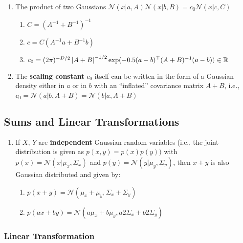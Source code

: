 \begin{enumerate}
    \item The product of two Gaussians 
    $\mathcal{N}(x|a, A) \mathcal{N}(x|b, B) = c_0\mathcal{N}(x|c, C)$
    \begin{enumerate}
        \item $C = (A^{-1} + B^{-1})^{-1}$

        \item $c = C(A^{-1}a + B^{-1}b)$

        \item $
            c_0 
            = (2\pi)^{-D/2}
            \left| A + B \right|^{-1/2}
            \exp(-0.5(a - b)^\top(A + B)^{-1}(a - b))
            \in \mathbb{R}
        $

    \end{enumerate}

    \item The \textbf{scaling constant} $c_0$ itself can be written in the form of a Gaussian density either in $a$ or in $b$ with an “inflated” covariance matrix $A + B$, i.e., $
        c_0 
        = \mathcal{N}(a|b, A + B) 
        = \mathcal{N}(b|a, A + B)
    $

\end{enumerate}


\subsection{Sums and Linear Transformations \cite{ism-1}} \label{Normal distribution: Bivariate/ Multivariate: Sums and Linear Transformations}

\begin{enumerate}
    \item If $X$, $Y$ are \textbf{independent} Gaussian random variables (i.e., the joint distribution is given as $p(x, y) = p(x)p(y))$ with $p(x) = \mathcal{N}(x|\mu_x , \Sigma_x)$ and $p(y) = \mathcal{N}(y|\mu_y , \Sigma_y)$, then $x + y$ is also Gaussian distributed and given by:
    \begin{enumerate}
        \item $p(x + y) = \mathcal{N}(\mu_x + \mu_y, \Sigma_x + \Sigma_y)$

        \item $p(ax + by) = \mathcal{N}(a\mu_x + b\mu_y , a2\Sigma_x + b2\Sigma_y)$
    \end{enumerate}
\end{enumerate}



\subsubsection{Linear Transformation}

